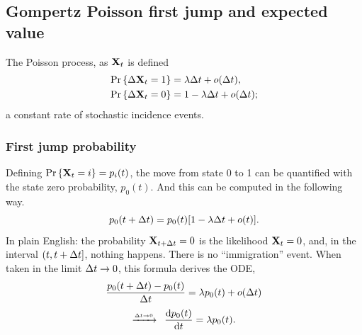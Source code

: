 \subsection{Gompertz Poisson first jump and expected value}
The Poisson process, as ${{\bf X}_t}$ is defined
\begin{align*}
{\text{Pr}\left\{\Delta {{\bf X}_t}= 1\right\}} &= \lambda \Delta t + o(\Delta t),\\
{\text{Pr}\left\{\Delta {{\bf X}_t} = 0\right\}} &= 1 - \lambda  \Delta t + o(\Delta t);
\end{align*}
a constant rate of stochastic incidence events. 
\subsubsection{First jump probability}
Defining ${\text{Pr}\left\{{{\bf X}_t} = i\right\}} = p_i(t)$, the move from state 0 to 1 can be quantified with the state zero probability, $p_0(t)$. And this can be computed in the following way. 
$$p_0(t+\Delta t) = p_0(t)[1 - \lambda \Delta t + o(t)].$$
In plain English: the probability ${{\bf X}_{t+\Delta t}} = 0$ is the likelihood ${{\bf X}_t} = 0$, and, in the interval $(t, t + \Delta t]$, nothing happens. There is no ``immigration'' event. When taken in the limit $\Delta t\to 0$, this formula derives the ODE, 
$$\frac{p_0(t+\Delta t) - p_0(t)}{\Delta t} = \lambda p_0(t)+  o(\Delta t)$$
$$ \xrightarrow{\underset{\Delta t \to 0}{}}  \hspace{5pt}  \displaystyle\frac{{\rm d} p_0(t)}{{\rm d} t} = \lambda p_0(t).$$ 

